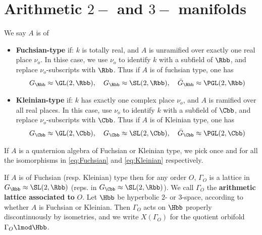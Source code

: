 \section{Arithmetic $2-$ and $3-$ manifolds}
\begin{definition}
    We say $A$ is of
    \begin{itemize}
        \item    \textbf{Fuchsian-type} if: $k$ is totally real, and $A$ is unramified over exactly one real place $\nu_o$. In thise case, we use $\nu_o$ to identify $k$ with a subfield of $\Rbb$, and replace $\nu_o$-subscripts with $\Rbb$. Thus if $A$ is of fuchsian type, one has
              \begin{align}\label{eq:Fuchsian}
                  G_\Rbb \approx \GL(2,\Rbb),\quad G_\Rbb \approx \SL(2,\Rbb),\quad  \bar{G}_\Rbb \approx \PGL(2,\Rbb)
              \end{align}
        \item \textbf{Kleinian-type} if: $k$ has exactly one complex place $\nu_o$, and $A$ is ramified over all real places. In this case, use $\nu_o$ to identify $k$ with a subfield of $\Cbb$, and replace $\nu_o$-subscripts with $\Cbb$. Thus if $A$ is of Kleinian type, one has
              \begin{align}\label{eq:Kleinian}
                  G_\Cbb \approx \GL(2,\Cbb),\quad G_\Cbb \approx\SL(2,\Cbb),\quad  \bar{G}_\Cbb \approx \PGL(2,\Cbb)
              \end{align}
    \end{itemize}
\end{definition}
If $A$ is a quaternion algebra of Fuchsian or Kleinian type, we pick once and for all the isomorphisms in \ref{eq:Fuchsian} and \ref{eq:Kleinian}  respectively.









If $A$ is of Fuchsian (resp. Kleinian) type then  for any order $O$,   $\Gamma_O$ is a lattice in $G_\Rbb  \approx \SL(2,\Rbb)$ (reps. in $G_\Cbb\approx \SL(2,\Rbb)$). We call $\Gamma_O$ the \textbf{arithmetic lattice associated to} $O$. Let $\Hbb$ be hyperbolic $2$- or $3$-space, according to whether $A$ is Fuchsian or Kleinian. Then $\Gamma_O$ acts on $\Hbb$ properly discontinuously by isometries, and we write $X(\Gamma_O)$ for the quotient orbifold $\Gamma_O \lmod \Hbb$.





